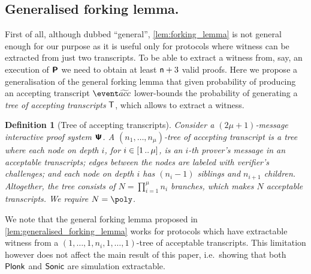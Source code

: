 \let\accentvec\vec \documentclass[runningheads,10pt]{llncs}
\newtheorem{definition}[theorem]{Definition}
\begin{document}
\subsection{Generalised forking lemma.}
First of all, although dubbed ``general'', \cref{lem:forking_lemma} is not
general enough for our purpose as it is useful only for protocols where witness
can be extracted from just two transcripts.  To be able to extract a witness
from, say, an execution of $\bm{\mathsf{P}}$ we need to obtain at least
$\mathsf{n} + 3$ valid proofs.  
Here we propose a generalisation of the general forking lemma that given
probability of producing an accepting transcript $\waccProb$ lower-bounds the
probability of generating a \emph{tree of accepting transcripts} $\mathsf{T}$,
which allows to extract a witness. 

\begin{definition}[Tree of accepting transcripts]
	\label{def:tree_of_accepting_transcripts}
	Consider a $(2\mu + 1)$-message interactive proof system $\bm{\mathsf{\Psi}}$. A $(n_1,
	\ldots, n_\mu)$-tree of accepting transcript is a tree where each node on
	depth $i$, for $i \in [1 \, .. \, \mu]$, is an $i$-th prover's message in an
	acceptable transcripts; edges between the nodes are labeled with verifier's
	challenges; and each node on depth $i$ has $(n_{i} - 1)$ siblings and $n_{i + 1}$ children.
	Altogether, the tree consists of $N = \prod_{i = 1}^\mu n_i$ branches, which
	makes $N$ acceptable transcripts. We require $N = \poly$.
\end{definition}

We note that the general forking lemma proposed in
\cref{lem:generalised_forking_lemma} works for protocols which have
extractable witness from a $(1, \ldots, 1, n_i, 1, \ldots, 1)$-tree of
acceptable transcripts. This limitation however does not affect the main
result of this paper, i.e.~showing that both $\textnormal{\textsf{Plonk}}$ and ${\textnormal{\textsf{Sonic}}}$ are
simulation extractable. 
\end{document}
